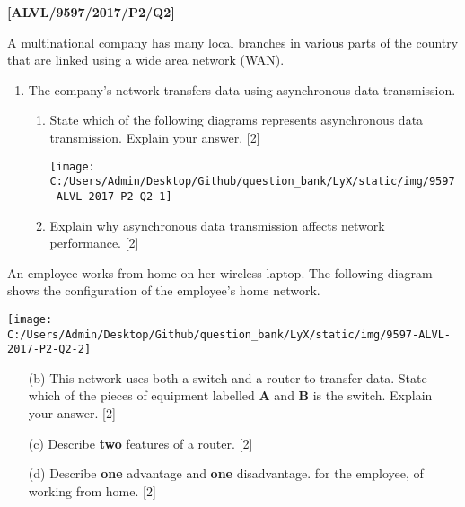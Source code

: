 \item \textbf{{[}ALVL/9597/2017/P2/Q2{]} }

A multinational company has many local branches in various parts of
the country that are linked using a wide area network (WAN). 
\begin{enumerate}
\item The company's network transfers data using asynchronous data transmission. 
\begin{enumerate}
\item State which of the following diagrams represents asynchronous data
transmission. Explain your answer. \hfill{}{[}2{]}
\begin{center}
\texttt{[image: C:/Users/Admin/Desktop/Github/question\_bank/LyX/static/img/9597-ALVL-2017-P2-Q2-1]}
\par\end{center}
\item Explain why asynchronous data transmission affects network performance.\hfill{}
{[}2{]}
\end{enumerate}
\end{enumerate}
An employee works from home on her wireless laptop. The following
diagram shows the configuration of the employee's home network.
\begin{center}
\texttt{[image: C:/Users/Admin/Desktop/Github/question\_bank/LyX/static/img/9597-ALVL-2017-P2-Q2-2]}
\par\end{center}
\begin{enumerate}
\item[(b)] This network uses both a switch and a router to transfer data. State
which of the pieces of equipment labelled \textbf{A} and \textbf{B}
is the switch. Explain your answer. \hfill{}{[}2{]}
\item[(c)] Describe \textbf{two} features of a router.\hfill{} {[}2{]}
\item[(d)] Describe \textbf{one} advantage and \textbf{one} disadvantage. for
the employee, of working from home.\hfill{} {[}2{]}
\end{enumerate}